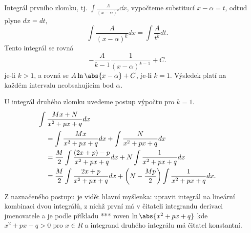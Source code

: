       Integrál prvního zlomku, tj. $\displaystyle{\int\frac{A}{(x-\alpha)^k}\dd{x}}$, vypočteme 
      substitucí $x-\alpha=t$, odtud plyne $dx = dt$,
      \begin{equation}\label{MA:int_ex_14}
        \int\frac{A}{(x-\alpha)^k}dx = \int\frac{A}{t^k}dt.
      \end{equation}
      Tento integrál se rovná
      \begin{equation}\label{MA:int_ex_16}
        -\frac{A}{k-1}\frac{1}{(x-\alpha)^{k-1}} + C.
      \end{equation}        
      je-li $k>1$, a rovná se $A\ln\abs{x-\alpha} + C$, je-li $k = 1$. Výsledek platí na každém
      intervalu neobsahujícím bod $\alpha$.
      
       U integrál druhého zlomku uvedeme postup výpočtu pro $k = 1$. 
      \begin{align*}
         \intertext{\(\displaystyle\int{\frac{Mx + N}{x^2+px+q}dx}\)}
           \quad &=  \int{\frac{Mx}{x^2+px+q}dx} + \int{\frac{N}{x^2+px+q}dx}                     
           \\  
           \quad &=  \frac{M}{2}\int{\frac{(2x + p) - p}{x^2+px+q}dx} + 
                     N\int{\frac{1}{x^2+px+q}dx}                                                   \\ 
           \quad &=  \frac{M}{2}\int{\frac{2x + p}{x^2+px+q}dx} + 
                      \left(N-\frac{Mp}{2}\right)\int{\frac{1}{x^2+px+q}dx.}                   
      \end{align*}  
      
      Z naznačeného postupu je vidět hlavní myšlenka: upravit integrál na lineární kombinaci dvou 
      integrálů, z nichž první má v čitateli integrandu derivaci jmenovatele a je podle příkladu 
      *** roven $\ln\abs{x^2+px+q}$ kde $x^2+px+q >0$ pro $x\in R$ a integrand druhého integrálu má 
      čitatel konstantní.
      
